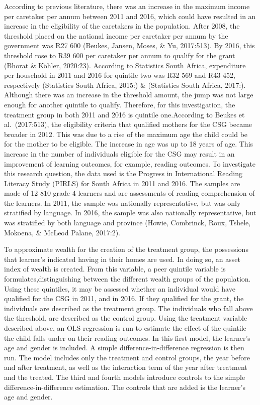 \documentclass[11pt,preprint, authoryear]{elsarticle}
\numberwithin{equation}{section}
\numberwithin{figure}{section}
\numberwithin{table}{section}
\begin{document}
According to previous literature, there was an increase in the maximum
income per caretaker per annum between 2011 and 2016, which could have
resulted in an increase in the eligibility of the caretakers in the
population. After 2008, the threshold placed on the national income per
caretaker per annum by the government was R27 600 (Beukes, Jansen,
Moses, \& Yu, 2017:513). By 2016, this threshold rose to R39 600 per
caretaker per annum to qualify for the grant (Bhorat \& Köhler,
2020:23). According to Statistics South Africa, expenditure per
household in 2011 and 2016 for quintile two was R32 569 and R43 452,
respectively (Statistics South Africa, 2015:) \& (Statistics South
Africa, 2017:). Although there was an increase in the threshold amount,
the jump was not large enough for another quintile to qualify.
Therefore, for this investigation, the treatment group in both 2011 and
2016 is quintile one.According to Beukes et al.~(2017:513), the
eligibility criteria that qualified mothers for the CSG became broader
in 2012. This was due to a rise of the maximum age the child could be
for the mother to be eligible. The increase in age was up to 18 years of
age. This increase in the number of individuals eligible for the CSG may
result in an improvement of learning outcomes, for example, reading
outcomes. To investigate this research question, the data used is the
Progress in International Reading Literacy Study (PIRLS) for South
Africa in 2011 and 2016. The samples are made of 12 810 grade 4 learners
and are assessments of reading comprehension of the learners. In 2011,
the sample was nationally representative, but was only stratified by
language. In 2016, the sample was also nationally representative, but
was stratified by both language and province (Howie, Combrinck, Roux,
Tshele, Mokoena, \& McLeod Palane, 2017:2).

To approximate wealth for the creation of the treatment group, the
possessions that learner's indicated having in their homes are used. In
doing so, an asset index of wealth is created. From this variable, a
peer quintile variable is formulates,distinguishing between the
different wealth groups of the population. Using these quintiles, it may
be assessed whether an individual would have qualified for the CSG in
2011, and in 2016. If they qualified for the grant, the individuals are
described as the treatment group. The individuals who fall above the
threshold, are described as the control group. Using the treatment
variable described above, an OLS regression is run to estimate the
effect of the quintile the child falls under on their reading outcomes.
In this first model, the learner's age and gender is included. A simple
difference-in-difference regression is then run. The model includes only
the treatment and control groups, the year before and after treatment,
as well as the interaction term of the year after treatment and the
treated. The third and fourth models introduce controls to the simple
difference-in-difference estimation. The controls that are added is the
learner's age and gender.
\end{document}
